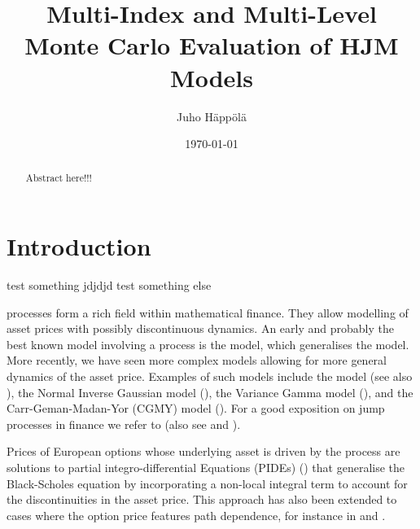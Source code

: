 \documentclass[11pt]{amsart}
\title[MIMC and MLMC HJM]{Multi-Index and Multi-Level Monte Carlo Evaluation of HJM Models}
\author{Juho H\"app\"ol\"a}
\date{\today}
\begin{document}
\begin{abstract}
Abstract here!!!
\end{abstract}

\maketitle


\section{Introduction}
\label{section:Introduction}

test something \cite{haji2015multi} jdjdjd
test something else \cite{haji2015multi}

\levy processes form a rich field within mathematical
finance. They allow modelling of asset prices with possibly discontinuous dynamics. An early and probably the best known model involving
a \levy process is
the \cite{Merton1976125} model, which generalises the \cite{black1973pricing} model. More recently, we have seen more complex models allowing
for more general dynamics of the asset price. Examples of such models include
the \cite{kou2002jump} model (see also \cite{Dotsis20073584}), the Normal Inverse Gaussian
model (\cite{barndorff1997normal, rydberg1997normal}),
the Variance Gamma model (\cite{madan1990variance, madan1998variance}),
and the Carr-Geman-Madan-Yor (CGMY) model
(\cite{cgmy_fine,carr2003stochastic}). For a good exposition on jump processes in finance we refer to \cite{conttankov}
(also see \cite{raible2000levy} and \cite{eberlein2001application}).

Prices of European options whose underlying asset is driven
by the \levy process are solutions to partial integro-differential
Equations (PIDEs) (\cite{nualart2001backward,briani_chioma_natalini,almendral2005numerical,kiessling2011diffusion})
that generalise
the Black-Scholes equation by incorporating a
non-local integral term to account for the discontinuities in
the asset price. This approach has also been extended to
cases where the option price features path dependence,
for instance in \cite{boyarchenko2002barrier} \cite{d2004penalty} and \cite{lord2008fast}.
\end{document}
